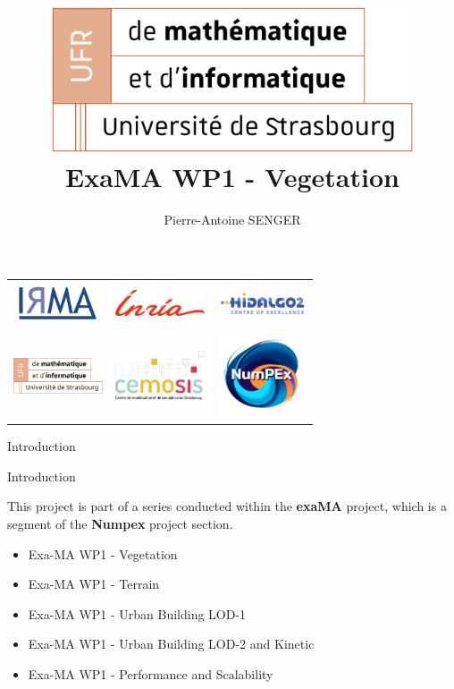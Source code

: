 \documentclass[10pt]{beamer}
\title[ExaMA WP1 Vegetation]{
  \includegraphics[width=0.8\textwidth]{images/logo-ufr.png}
  ExaMA WP1 - Vegetation}
\author[PA Senger]{Pierre-Antoine SENGER}
\begin{document}
\begin{frame}[plain]
    \begin{center}
    \begin{tabular}{c c c}
    \includegraphics[width=100px]{images/logo-irma.png} &
    \includegraphics[width=100px]{images/logo-inria.png} &
    \includegraphics[width=100px]{images/logo-hidalgo2.png} \\
    \includegraphics[width=100px]{images/logo-ufr.png} &
    \includegraphics[width=100px]{images/logo-cemosis.png} &
    \includegraphics[width=100px]{images/logo-numpex.png} \\
    \end{tabular}
    \end{center}
\end{frame}

\begin{frame}{Introduction}
  \titlepage
\end{frame}

\begin{frame}{Introduction}

	This project is part of a series conducted within the \textbf{exaMA} project,
	which is a segment of the \textbf{Numpex} project section.

	\begin{itemize}
		\item Exa-MA WP1 - Vegetation
		\item Exa-MA WP1 - Terrain
		\item Exa-MA WP1 - Urban Building LOD-1
		\item Exa-MA WP1 - Urban Building LOD-2 and Kinetic
		\item Exa-MA WP1 - Performance and Scalability
	\end{itemize}
\end{frame}
\end{document}
